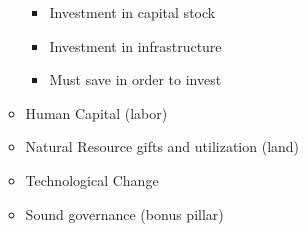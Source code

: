 \documentclass[12pt]{article}
\begin{document}
\begin{enumerate}
\begin{itemize}
\begin{itemize}
          \item Investment in capital stock

          \item Investment in infrastructure

          \item Must save in order to invest

        \end{itemize}

      \item Human Capital (labor)

      \item Natural Resource gifts and utilization (land)

      \item Technological Change

      \item Sound governance (bonus pillar)

    \end{itemize}

\end{enumerate}
\end{document}
